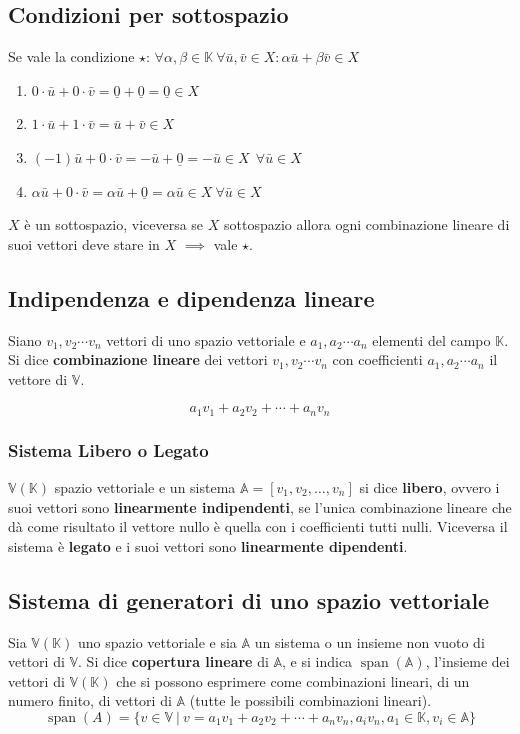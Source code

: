 \documentclass{article}
\DeclareMathOperator{\Span}{span}
\begin{document}
\subsection{Condizioni per sottospazio}

Se vale la condizione $\star$: $\forall\alpha,\beta\in\mathbb K \ \forall\bar u,\bar v\in X:\alpha\bar u+\beta\bar v\in X$
\begin{enumerate}
    \item $0\cdot\bar u + 0\cdot\bar v = \underline 0 + \underline 0 = \underline 0\in X$
    \item $1\cdot\bar u+1\cdot\bar v = \bar u+\bar v \in X$
    \item $(-1)\bar u + 0 \cdot\bar v = -\bar u +\underline 0 = -\bar u \in X \ \ \forall\bar u\in X$
    \item $\alpha\bar u+0\cdot\bar v=\alpha\bar u+\underline 0 = \alpha\bar u\in X \ \forall\bar u \in X$
\end{enumerate}
$X$ è un sottospazio, viceversa se $X$ sottospazio allora ogni combinazione lineare di suoi vettori deve stare in $X$ $\implies$ vale $\star$.

\subsection{Indipendenza e dipendenza lineare}
Siano $v_1, v_2\cdots v_n$ vettori di uno spazio vettoriale e $a_1, a_2\cdots a_n$
elementi del campo $\mathbb{K}$. Si dice \textbf{combinazione lineare} dei
vettori $v_1, v_2 \cdots v_n$ con coefficienti $a_1, a_2\cdots a_n$ il vettore di
$\mathbb V$. 

\[a_1v_1+a_2v_2+\cdots+a_n v_n\]


\subsubsection{Sistema Libero o Legato}
$\mathbb V(\mathbb K)$ spazio vettoriale e un sistema $\mathbb A=[v_1, v_2,\ldots,v_n]$ si dice \textbf{libero}, ovvero i suoi vettori sono \textbf{linearmente indipendenti}, se l'unica combinazione lineare che dà come risultato il vettore nullo è quella con i coefficienti tutti nulli. Viceversa il sistema è \textbf{legato} e i suoi vettori sono \textbf{linearmente dipendenti}.

\subsection{Sistema di generatori di uno spazio vettoriale}
Sia $\mathbb V(\mathbb K)$ uno spazio vettoriale e sia $\mathbb A$ un sistema o
un insieme non vuoto di vettori di $\mathbb V$. Si dice \textbf{copertura lineare} di $\mathbb A$, e si indica $\Span(\mathbb A)$, l'insieme dei vettori
di $\mathbb V(\mathbb K)$ che si possono esprimere come combinazioni lineari,
di un numero finito, di vettori di $\mathbb A$ (tutte le possibili combinazioni
lineari).
\[
    \Span(A) = \{v\in\mathbb V \ | \ v = a_1v_1+a_2v_2+\cdots+a_n v_n,a_i v_n,a_1\in\mathbb K,v_i\in\mathbb A\}
\]
\end{document}
